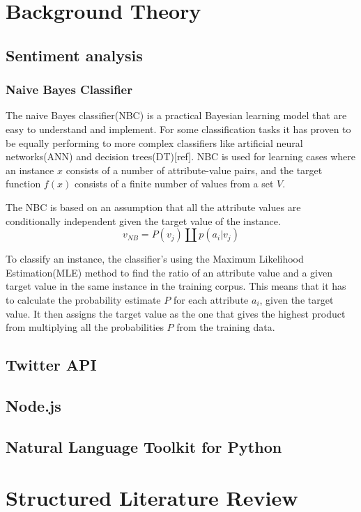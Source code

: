\section{Background Theory}
	\subsection{Sentiment analysis}
		\subsubsection{Naive Bayes Classifier}
		The naive Bayes classifier(NBC) is a practical Bayesian learning model that are easy to understand and implement. For some classification tasks it has proven to be equally performing to more complex classifiers like artificial neural networks(ANN) and decision trees(DT)[ref]. NBC is used for learning cases where an instance $x$ consists of a number of attribute-value pairs, and the target function $f(x)$ consists of a finite number of values from a set $V$.

The NBC is based on an assumption that all the attribute values are conditionally independent given the target value of the instance.
\begin{equation}
\label{equation:nbc}
v_{NB} = P(v_j) \amalg p(a_i|v_j)
\end{equation}

To classify an instance, the classifier's using the Maximum Likelihood Estimation(MLE) method to find the ratio of an attribute value and a given target value in the same instance in the training corpus. This means that it has to calculate the probability estimate $P$ for each attribute $a_i$, given the target value. It then assigns the target value as the one that gives the highest product from multiplying all the probabilities $P$ from the training data.
	\subsection{Twitter API}
	
	
	\subsection{Node.js}
		
	
	\subsection{Natural Language Toolkit for Python}

\section{Structured Literature Review}